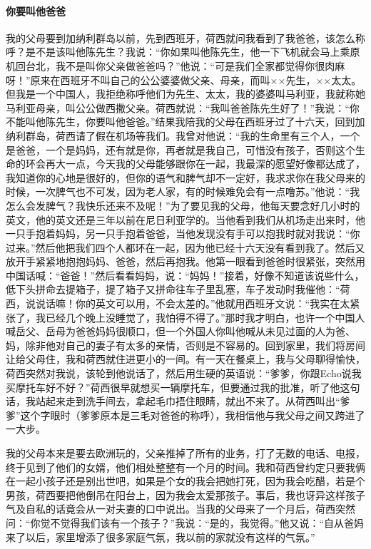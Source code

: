 \paragraph{你要叫他爸爸}
\par 我的父母要到加纳利群岛以前，先到西班牙，荷西就问我看到了我爸爸，该怎么称呼？是不是该叫他陈先生？我说：“你如果叫他陈先生，他一下飞机就会马上乘原机回台北，我不是叫你父亲做爸爸吗？”他说：“可是我们全家都觉得你很肉麻呀！”原来在西班牙不叫自己的公公婆婆做父亲、母亲，而叫××先生，××太太。但我是一个中国人，我拒绝称呼他们为先生、太太，我的婆婆叫马利亚，我就称她马利亚母亲，叫公公做西撒父亲。荷西就说：“我叫爸爸陈先生好了！”我说：“你不能叫他陈先生，你要叫他爸爸。”结果我陪我的父母在西班牙过了十六天，回到加纳利群岛，荷西请了假在机场等我们。我曾对他说：“我的生命里有三个人，一个是爸爸，一个是妈妈，还有就是你，再者就是我自己，可惜没有孩子，否则这个生命的环会再大一点，今天我的父母能够跟你在一起，我最深的愿望好像都达成了，我知道你的心地是很好的，但你的语气和脾气却不一定好，我求求你在我父母来的时候，一次脾气也不可发，因为老人家，有的时候难免会有一点噜苏。”他说：“我怎么会发脾气？我快乐还来不及呢！”为了要见我的父母，他每天要念好几小时的英文，他的英文还是三年以前在尼日利亚学的。当他看到我们从机场走出来时，他一只手抱着妈妈，另一只手抱着爸爸，当他发现没有手可以抱我时就对我说：“你过来。”然后他把我们四个人都环在一起，因为他已经十六天没有看到我了。然后又放开手紧紧地抱抱妈妈、爸爸，然后再抱我。他第一眼看到爸爸时很紧张，突然用中国话喊：“爸爸！”然后看看妈妈，说：“妈妈！”接着，好像不知道该说些什么，低下头拼命去提箱子，提了箱子又拼命往车子里乱塞，车子发动时我催他：“荷西，说说话嘛！你的英文可以用，不会太差的。”他就用西班牙文说：“我实在太紧张了，我已经几个晚上没睡觉了，我怕得不得了。”那时我才明白，也许一个中国人喊岳父、岳母为爸爸妈妈很顺口，但一个外国人你叫他喊从未见过面的人为爸、妈，除非他对自己的妻子有太多的亲情，否则是不容易的。回到家里，我们将房间让给父母住，我和荷西就住进更小的一间。有一天在餐桌上，我与父母聊得愉快，荷西突然对我说，该轮到他说话了，然后用生硬的英语说：“爹爹，你跟Echo说我买摩托车好不好？”荷西很早就想买一辆摩托车，但要通过我的批准，听了他这句话，我站起来走到洗手间去，拿起毛巾捂住眼睛，就出不来了。从荷西叫出“爹爹”这个字眼时（爹爹原本是三毛对爸爸的称呼），我相信他与我父母之间又跨进了一大步。
\par 我的父母本来是要去欧洲玩的，父亲推掉了所有的业务，打了无数的电话、电报，终于见到了他们的女婿，他们相处整整有一个月的时间。我和荷西曾约定只要我俩在一起小孩子还是别出世吧，如果是个女的我会把她打死，因为我会吃醋，若是个男孩，荷西要把他倒吊在阳台上，因为我会太爱那孩子。事后，我也讶异这样孩子气及自私的话竟会从一对夫妻的口中说出。当我的父母来了一个月后，荷西突然问：“你觉不觉得我们该有一个孩子？”我说：“是的，我觉得。”他又说：“自从爸妈来了以后，家里增添了很多家庭气氛，我以前的家就没有这样的气氛。”
